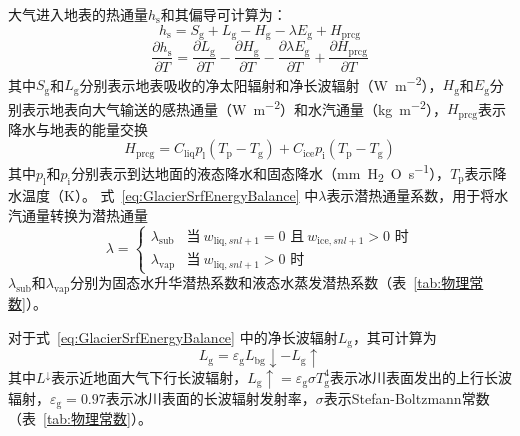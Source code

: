 大气进入地表的热通量$h_{\mathrm {s}} $和其偏导可计算为：
\begin{equation}\label{eq:GlacierSrfEnergyBalance}
  h_{\mathrm {s}}  = S_{\mathrm {g}}  + L_{\mathrm {g}}  - H_{\mathrm {g}}  - \lambda E_{\mathrm {g}}  + H_{\mathrm{prcg}}
\end{equation}
\begin{equation}
  \frac{\partial h_{\mathrm {s}} }{\partial T} = \frac{\partial L_{\mathrm {g}} }{\partial T} -\frac{\partial H_{\mathrm {g}} }{\partial T} -\frac{\partial \lambda E_{\mathrm {g}} }{\partial T} +\frac{\partial H_{\mathrm{prcg}}}{\partial T}
\end{equation}
其中$S_{\mathrm {g}} $和$L_{\mathrm {g}} $分别表示地表吸收的净太阳辐射和净长波辐射（\unit{W.m^{-2}}），$H_{\mathrm {g}} $和$E_{\mathrm {g}} $分别表示地表向大气输送的感热通量（\unit{W.m^{-2}}）和水汽通量（\unit{kg.m^{-2}}），$H_{\mathrm{prcg}}$表示降水与地表的能量交换
\begin{equation}
  H_{\mathrm{prcg}} = C_{\mathrm{liq}}p_{\mathrm {l}} \left(T_{\mathrm {p}} -T_{\mathrm {g}} \right) + C_{\mathrm{ice}}p_{\mathrm {i}} \left(T_{\mathrm {p}} -T_{\mathrm {g}} \right)
\end{equation}
其中$p_{\mathrm {l}} $和$p_{\mathrm {i}} $分别表示到达地面的液态降水和固态降水（\unit{mm.H_2O.s^{-1}}），$T_{\mathrm {p}} $表示降水温度（K）。
式~\eqref{eq:GlacierSrfEnergyBalance} 中$\lambda$表示潜热通量系数，用于将水汽通量转换为潜热通量
\begin{equation}
  \lambda = \begin{cases}
    \lambda_{\mathrm {sub}}  &\text{当}\ w_{\mathrm{liq},snl+1}=0\text{ 且}\ w_{\mathrm{ice},snl+1}>0\text{ 时}\\
    \lambda_{\mathrm {vap}}  &\text{当}\ w_{\mathrm{liq},snl+1}>0\text{ 时}
  \end{cases}
\end{equation}
$\lambda_{\mathrm {sub}} $和$\lambda_{\mathrm {vap}} $分别为固态水升华潜热系数和液态水蒸发潜热系数（表~\ref{tab:物理常数}）。

对于式~\eqref{eq:GlacierSrfEnergyBalance} 中的净长波辐射$L_{\mathrm {g}} $，其可计算为
\begin{equation}
  L_{\mathrm {g}}  = \varepsilon_{\mathrm {g}}  L_{\mathrm{bg}}\downarrow - L_{\mathrm {g}} \uparrow
\end{equation}
其中$L^ \downarrow$表示近地面大气下行长波辐射，$L_{\mathrm {g}} \uparrow=\varepsilon_{\mathrm {g}} \sigma T^4_{\mathrm {g}} $表示冰川表面发出的上行长波辐射，$\varepsilon_{\mathrm {g}} =0.97$表示冰川表面的长波辐射发射率，$\sigma$表示Stefan-Boltzmann常数（表~\ref{tab:物理常数}）。

